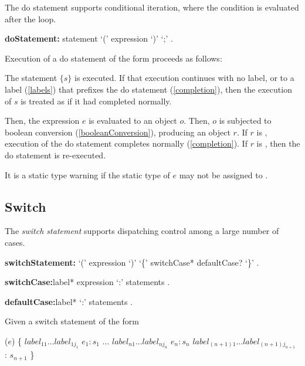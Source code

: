\documentclass{article}
\begin{document}
\LMHash{}
The do statement supports conditional iteration, where the condition is evaluated after the loop.

\begin{grammar}
{\bf doStatement:}\DO{} statement \WHILE{} `(' expression `)' `{\escapegrammar ;}'
  .
\end{grammar}

\LMHash{}
Execution of a do statement of the form  proceeds as follows:

\LMHash{}
The statement $\{s\}$ is executed.
If that execution continues with no label, or to a label (\ref{labels}) that prefixes the do statement (\ref{completion}), then the execution of $s$ is treated as if it had completed normally.

\LMHash{}
Then, the expression $e$ is evaluated to an object $o$.
Then, $o$ is subjected to boolean conversion (\ref{booleanConversion}), producing an object $r$.
If $r$ is \FALSE{}, execution of the do statement completes normally (\ref{completion}).
If $r$ is \TRUE{}, then the do statement is re-executed.

\LMHash{}
It is a static type warning if the static type of $e$ may not be assigned to .


\subsection{Switch}

\LMHash{}
The {\em switch statement} supports dispatching control among a large number of cases.

\begin{grammar}
{\bf switchStatement:}\SWITCH{} `(' expression `)' `\{' switchCase* defaultCase? `\}'
  .

{\bf switchCase:}label* \CASE{} expression `{\escapegrammar :}' statements
  .

{\bf defaultCase:}label* \DEFAULT{} `{\escapegrammar :}' statements
  .
\end{grammar}

\LMHash{}
 Given a switch statement of the form

\begin{dartCode}
\SWITCH{} ($e$) \{
   $label_{11} \ldots label_{1j_1}$ \CASE{} $e_1: s_1$
   $\ldots$
   $label_{n1} \ldots label_{nj_n}$ \CASE{} $e_n: s_n$
   $label_{(n+1)1} \ldots label_{(n+1)j_{n+1}}$ \DEFAULT{}: $s_{n+1}$
\}
\end{dartCode}
\end{document}
